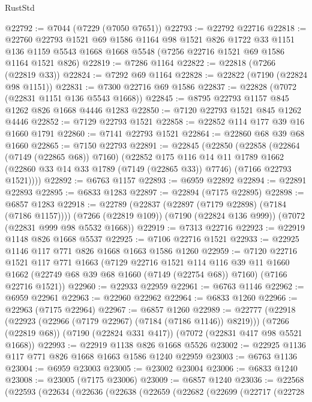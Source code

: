 \begin{lexlean}{RustStd}
\begin{coremodule}
@22792 := @7044 (@7229 (@7050 @7651))
@22793 := @22792 @22716
@22818 := @22760
    @22793
    @1521
    @69
    @1586
    @1164
    @98
    @1521
    @826
    @1722
    @33
    @1151
    @136
    @1159
    @5543
    @1668
    @1668
    @5548
    (@7256 @22716 @1521 @69 @1586 @1164 @1521 @826)
@22819 := @7286 @1164
@22822 := @22818 (@7266 (@22819 @33))
@22824 := @7292 @69 @1164
@22828 := @22822 (@7190 (@22824 @98 @1151))
@22831 := @7300 @22716 @69 @1586
@22837 := @22828 (@7072 (@22831 @1151 @136 @5543 @1668))
@22845 := @8795 @22793 @1157 @845 @1262 @826 @1668 @4446 @1283
@22850 := @7120 @22793 @1521 @845 @1262 @4446
@22852 := @7129 @22793 @1521
@22858 := @22852 @114 @177 @39 @16 @1660 @1791
@22860 := @7141 @22793 @1521
@22864 := @22860 @68 @39 @68 @1660
@22865 := @7150 @22793
@22891 := @22845
    (@22850
      (@22858
        (@22864 (@7149 (@22865 @68)) @7160)
        (@22852
          @175
          @116
          @14
          @11
          @1789
          @1662
          (@22860 @33 @14 @33 @1789 (@7149 (@22865 @33)) @7746)
          (@7166 @22793 @1521))))
@22892 := @6763 @1157
@22893 := @6959 @22892
@22894 := @22891 @22893
@22895 := @6833 @1283
@22897 := @22894 (@7175 @22895)
@22898 := @6857 @1283
@22918 := @22789
    (@22837 (@22897 (@7179 @22898) (@7184 (@7186 @1157))))
    (@7266 (@22819 @109))
    (@7190 (@22824 @136 @999))
    (@7072 (@22831 @999 @98 @5532 @1668))
@22919 := @7313 @22716
@22923 := @22919 @1148 @826 @1668 @5537
@22925 := @7106 @22716 @1521
@22933 := @22925 @1146 @117 @771 @826 @1668 @1663 @1586 @1260
@22959 := @7120
    @22716
    @1521
    @117
    @771
    @1663
    (@7129
      @22716
      @1521
      @114
      @116
      @39
      @11
      @1660
      @1662
      (@22749 @68 @39 @68 @1660 (@7149 (@22754 @68)) @7160)
      (@7166 @22716 @1521))
@22960 := @22933 @22959
@22961 := @6763 @1146
@22962 := @6959 @22961
@22963 := @22960 @22962
@22964 := @6833 @1260
@22966 := @22963 (@7175 @22964)
@22967 := @6857 @1260
@22989 := @22777
    (@22918 (@22923 (@22966 (@7179 @22967) (@7184 (@7186 @1146)) @8219)))
    (@7266 (@22819 @68))
    (@7190 (@22824 @331 @417))
    (@7072 (@22831 @417 @98 @5521 @1668))
@22993 := @22919 @1138 @826 @1668 @5526
@23002 := @22925 @1136 @117 @771 @826 @1668 @1663 @1586 @1240 @22959
@23003 := @6763 @1136
@23004 := @6959 @23003
@23005 := @23002 @23004
@23006 := @6833 @1240
@23008 := @23005 (@7175 @23006)
@23009 := @6857 @1240
@23036 := @22568
    (@22593
      (@22634
        (@22636
          (@22638
            (@22659
              (@22682
                (@22699
                  (@22717
                    (@22728

\end{coremodule}
\end{lexlean}
